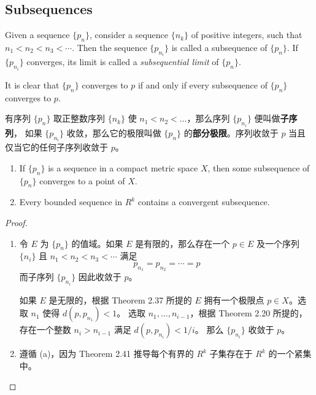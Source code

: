 \documentclass[../poma-notes.tex]{subfiles}
\begin{document}
\subsection*{Subsequences}

\begin{definition}
  Given a sequence $\{p_n\}$, consider a sequence $\{n_k\}$ of positive integers, such that $n_1 < n_2 < n_3 < \cdots$.
  Then the sequence $\{p_{n_i}\}$ is called a subsequence of $\{p_n\}$. If $\{p_{n_i}\}$ converges, its limit is called
  a \textit{subsequential limit} of $\{p_n\}$.

  It is clear that $\{p_n\}$ converges to $p$ if and only if every subsequence of $\{p_n\}$ converges to $p$.
\end{definition}

\begin{anote}
  有序列 $\{p_n\}$ 取正整数序列 $\{n_k\}$ 使 $n_1 < n_2 < \dots$，那么序列 $\{p_{n_i}\}$ 便叫做\textbf{子序列}，
  如果 $\{p_{n_i}\}$ 收敛，那么它的极限叫做 $\{p_n\}$ 的\textbf{部分极限}。序列收敛于 $p$ 当且仅当它的任何子序列收敛于 $p$。
\end{anote}

\begin{theorem}
  \begin{enumerate}[label=(\alph*)]
    \item If $\{p_n\}$ is a sequence in a compact metric space $X$, then some subsequence of $\{p_n\}$ converges to a
          point of $X$.
    \item Every bounded sequence in $R^k$ contains a convergent subsequence.
  \end{enumerate}
\end{theorem}

\begin{proof}
  \begin{enumerate}[label=(\alph*)]
    \item 令 $E$ 为 $\{p_n\}$ 的值域。如果 $E$ 是有限的，那么存在一个 $p\in E$ 及一个序列 $\{n_i\}$ 且 $n_1<n_2<n_3<\cdots$
          满足
          \[ p_{n_1} = p_{n_2} = \cdots = p \]
          而子序列 $\{p_{n_i}\}$ 因此收敛于 $p$。

          如果 $E$ 是无限的，根据 Theorem 2.37 所提的 $E$ 拥有一个极限点 $p \in X$。选取 $n_1$ 使得 $d(p,p_{n_1}) < 1$。
          选取 $n_1, \dots, n_{i-1}$，根据 Theorem 2.20 所提的，存在一个整数 $n_i > n_{i-1}$ 满足 $d(p, p_{n_i}) < 1/i$。
          那么 $\{p_{n_i}\}$ 收敛于 $p$。
    \item 遵循 (a)，因为 Theorem 2.41 推导每个有界的 $R^k$ 子集存在于 $R^k$ 的一个紧集中。
  \end{enumerate}
\end{proof}
\end{document}
